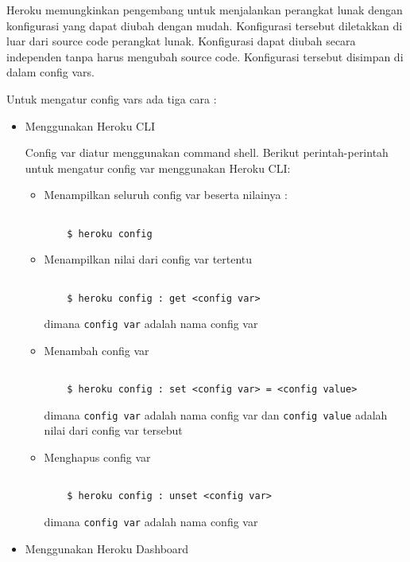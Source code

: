 Heroku memungkinkan pengembang untuk menjalankan perangkat lunak dengan konfigurasi yang dapat diubah dengan mudah. Konfigurasi tersebut diletakkan di luar dari source code perangkat lunak. Konfigurasi dapat diubah secara independen tanpa harus mengubah source code. Konfigurasi tersebut disimpan di dalam config vars.

Untuk mengatur config vars ada tiga cara : 
\begin{itemize}
\item Menggunakan Heroku CLI

Config var diatur menggunakan command shell. Berikut perintah-perintah untuk mengatur config var menggunakan Heroku CLI:
\begin{itemize}
\item Menampilkan seluruh config var beserta nilainya : 

\begin{lstlisting}

	$ heroku config

\end{lstlisting}

\item Menampilkan nilai dari config var tertentu 
\begin{lstlisting}

	$ heroku config : get <config var>

\end{lstlisting}
dimana \texttt{config var} adalah nama config var

\item Menambah config var

\begin{lstlisting}

	$ heroku config : set <config var> = <config value>

\end{lstlisting}
dimana \texttt{config var} adalah nama config var dan \texttt{config value} adalah nilai dari config var tersebut

\item Menghapus config var

\begin{lstlisting}

	$ heroku config : unset <config var>

\end{lstlisting}
dimana \texttt{config var} adalah nama config var

\end{itemize}

\item Menggunakan Heroku Dashboard


\end{itemize}
